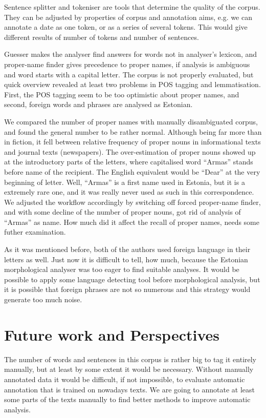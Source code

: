 \documentclass[runningheads]{llncs}
\begin{document}
Sentence splitter and tokeniser are tools that determine the quality of the corpus.
They can be adjusted by properties of corpus and annotation aims, e.g. we can annotate a date as one token, or as a series of several tokens.  This would give different results of number of tokens and number of sentences.


Guesser makes the analyser find answers for words not in analyser's lexicon, and proper-name finder gives precedence to proper names, if analysis is ambiguous and word starts with a capital letter.  The corpus is not properly evaluated, but quick overview revealed at least two problems in POS tagging and lemmatisation.  First, the POS tagging seem to be too optimistic about proper names, and second, foreign words and phrases are analysed as Estonian.

We compared the number of proper names with manually disambiguated corpus, and found the general number to be rather normal.  Although being far more than in fiction, it fell between relative frequency of proper nouns in informational texts and journal texts (newspapers).  The over-estimation of proper nouns showed up at the introductory parts of the letters, where capitalised word ``Armas'' stands before name of the recipient.  The English equivalent would be ``Dear'' at the very beginning of letter.  Well, ``Armas'' is a first name used in Estonia, but it is a extremely rare one, and it was really never used as such in this correspondence.  We adjusted the workflow accordingly by switching off forced proper-name finder, and with some decline of the number of proper nouns, got rid of analysis of ``Armas'' as name.  How much did it affect the recall of proper names, needs some futher examination.

As it was mentioned before, both of the authors used foreign language in their letters as well.  Just now it is difficult to tell, how much, because the Estonian morphological analyser was too eager to find suitable analyses.  It would be possible to apply some language detecting tool before morphological analysis, but it is possible that foreign phrases are not so numerous and this strategy would generate too much noise.


\section{Future work and Perspectives}

The number of words and sentences in this corpus is rather big to tag it entirely manually, but at least by some extent it would be necessary.  Without manually annotated data it would be difficult, if not impossible, to evaluate automatic annotation that is trained on nowadays texts.  We are going to annotate at least some parts of the texts manually to find better methods to improve automatic analysis.
\end{document}
